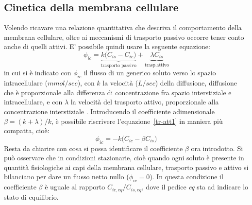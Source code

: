 \subsection{Cinetica della membrana cellulare}\label{ss:trasp_membr}
Volendo ricavare una relazione quantitativa che descriva il comportamento della membrana cellulare, oltre ai meccanismi di trasporto passivo occorre tener conto anche di quelli attivi. E' possibile quindi usare la seguente equazione:\\
\begin{equation}\label{tr-att1}
	\phi_{ic} = \underbrace{k \bigl(C_{is} - C_{ic}\bigr)}_{\text{trasporto passivo}} + \underbrace{\lambda C_{is}}_{\text{trasp.attivo}}
\end{equation}
\newline
in cui si è indicato con $\phi_{ic}$ il flusso di un generico soluto verso lo spazio intracellulare ($mmol/sec$), con $k$ la velocità ($L/sec$) della diffusione, diffusione che è proporzionale alla differenza di concentrazione fra spazio interstiziale e intracellulare, e con $\lambda$ la velocità del trasporto attivo, proporzionale alla concentrazione interstiziale \cite{trasp-att}.
Introducendo il coefficiente adimensionale $\beta = (k+\lambda)/k$, è possibile riscrivere l'equazione~\ref{tr-att1} in maniera più compatta, cioè:
\begin{equation}
	\phi_{ic} = - k \bigl(C_{ic} - \beta C_{is}\bigr)
	\label{flusso_ic}
\end{equation}
Resta da chiarire con cosa si possa identificare il coefficiente $\beta$ ora introdotto. Si può osservare che in condizioni stazionarie, cioè quando ogni soluto è presente in quantità fisiologiche ai capi della membrana cellulare, trasporto passivo e attivo si bilanciano per dare un flusso netto nullo ($\phi_{ic}=0$). In questa condizione il coefficiente $\beta$ è uguale al rapporto $C_{ic,eq}/C_{is,eq}$, dove il pedice \textit{eq} sta ad indicare lo stato di equilibrio.